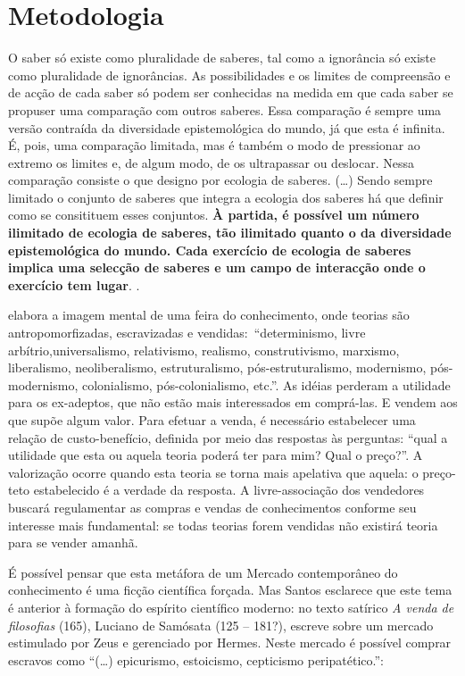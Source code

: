 \chapter{Metodologia}\label{cap:metodologia}

\begin{citacao}
O saber só existe como pluralidade de saberes, tal como a ignorância só existe como pluralidade de ignorâncias. As possibilidades e os limites de compreensão e de acção de cada saber só podem ser conhecidas na medida em que cada saber se propuser uma comparação com outros saberes. Essa comparação é sempre uma versão contraída da diversidade epistemológica do mundo, já que esta é infinita. É, pois, uma comparação limitada, mas é também o modo de pressionar ao extremo os limites e, de algum modo, de os ultrapassar ou deslocar. Nessa comparação consiste o que designo por ecologia de saberes. (\ldots) Sendo sempre limitado o conjunto de saberes que integra a ecologia dos saberes há que definir como se consitituem esses conjuntos. \textbf{À partida, é possível um número ilimitado de ecologia de saberes, tão ilimitado quanto o da diversidade epistemológica do mundo. Cada exercício de ecologia de saberes implica uma selecção de saberes e um campo de interacção onde o exercício tem lugar}. \cite[p.~28-30]{santos_filosofia_2008}.
\end{citacao}

 elabora a imagem mental  de uma feira do conhecimento, onde teorias  são antropomorfizadas, escravizadas e vendidas:\ ``determinismo, livre arbítrio,universalismo, relativismo, realismo, construtivismo, marxismo, liberalismo, neoliberalismo, estruturalismo, pós-estruturalismo, modernismo, pós-modernismo, colonialismo, pós-colonialismo, etc.''. As idéias perderam a utilidade para os ex-adeptos, que não estão mais interessados em comprá-las. E vendem aos que supõe algum valor. Para efetuar a venda, é necessário estabelecer uma relação de custo-benefício, definida por meio das respostas às perguntas: ``qual a utilidade que esta ou aquela teoria poderá ter para mim? Qual o preço?''. A valorização ocorre quando esta teoria se torna mais apelativa que aquela: o preço-teto estabelecido é a verdade da resposta. A livre-associação dos vendedores buscará regulamentar as compras e vendas de conhecimentos conforme seu interesse mais fundamental: se todas teorias forem vendidas não existirá teoria para se vender amanhã.

É possível pensar que esta metáfora de um Mercado contemporâneo do conhecimento é uma ficção científica forçada. Mas Santos esclarece que este tema é anterior à formação do espírito científico moderno: no texto satírico \emph{A venda de filosofias} (165), Luciano de Samósata (125 -- 181?),  escreve sobre um mercado estimulado por Zeus e gerenciado por Hermes. Neste mercado é possível comprar escravos como  ``(\ldots) epicurismo, estoicismo, cepticismo peripatético.'':

